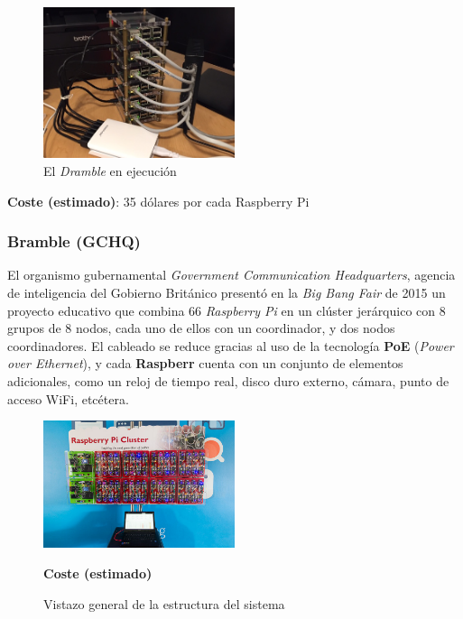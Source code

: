 \begin{figure}[H]
\centering
\includegraphics[width=0.5\textwidth]{Chapters/Chapter1/Figures/raspberry-pi-dramble-cluster-wired.jpg}
\caption{El \textit{Dramble} en ejecución}
\label{geerling:dramble}
\end{figure}


\textbf{Coste (estimado)}: 35 dólares por cada Raspberry Pi\citationneeded

\subsubsection{Bramble (GCHQ)}

El organismo gubernamental \textit{Government Communication Headquarters}, agencia de inteligencia del Gobierno Británico presentó en la \textit{Big Bang Fair} de 2015 un proyecto educativo que combina 66 \textit{Raspberry Pi} en un clúster jerárquico con 8 grupos de 8 nodos, cada uno de ellos con un coordinador, y dos nodos coordinadores. El cableado se reduce gracias al uso de la tecnología \textbf{PoE} (\textit{Power over Ethernet}), y cada \textbf{Raspberr} cuenta con un conjunto de elementos adicionales, como un reloj de tiempo real, disco duro externo, cámara, punto de acceso WiFi, etcétera\cite{gchqbramble}.

\begin{figure}[H]
\centering
\includegraphics[width=0.5\textwidth]{Chapters/Chapter1/Figures/bramblegchq}
\caption{Vistazo general de la estructura del sistema}
\label{gchq:bramble}

\textbf{Coste (estimado)}\citationneeded

\end{figure}

